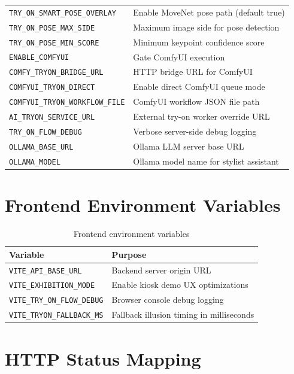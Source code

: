 \begin{longtable}{@{}p{5.5cm}p{8cm}@{}}
  \texttt{TRY\_ON\_SMART\_POSE\_OVERLAY} & Enable MoveNet pose path (default true) \\
  \texttt{TRY\_ON\_POSE\_MAX\_SIDE} & Maximum image side for pose detection \\
  \texttt{TRY\_ON\_POSE\_MIN\_SCORE} & Minimum keypoint confidence score \\
  \texttt{ENABLE\_COMFYUI} & Gate ComfyUI execution \\
  \texttt{COMFY\_TRYON\_BRIDGE\_URL} & HTTP bridge URL for ComfyUI \\
  \texttt{COMFYUI\_TRYON\_DIRECT} & Enable direct ComfyUI queue mode \\
  \texttt{COMFYUI\_TRYON\_WORKFLOW\_FILE} & ComfyUI workflow JSON file path \\
  \texttt{AI\_TRYON\_SERVICE\_URL} & External try-on worker override URL \\
  \texttt{TRY\_ON\_FLOW\_DEBUG} & Verbose server-side debug logging \\
  \texttt{OLLAMA\_BASE\_URL} & Ollama LLM server base URL \\
  \texttt{OLLAMA\_MODEL} & Ollama model name for stylist assistant \\
\end{longtable}

\section{Frontend Environment Variables}
\label{app:frontend-env}

\begin{table}[H]
  \centering
  \caption{Frontend environment variables}
  \label{tab:frontend-env}
  \begin{tabular}{@{}lp{9cm}@{}}
    \toprule
    \textbf{Variable} & \textbf{Purpose} \\
    \midrule
    \texttt{VITE\_API\_BASE\_URL} & Backend server origin URL \\
    \texttt{VITE\_EXHIBITION\_MODE} & Enable kiosk demo UX optimizations \\
    \texttt{VITE\_TRY\_ON\_FLOW\_DEBUG} & Browser console debug logging \\
    \texttt{VITE\_TRYON\_FALLBACK\_MS} & Fallback illusion timing in milliseconds \\
    \bottomrule
  \end{tabular}
\end{table}

\section{HTTP Status Mapping}
\label{app:status-mapping}


